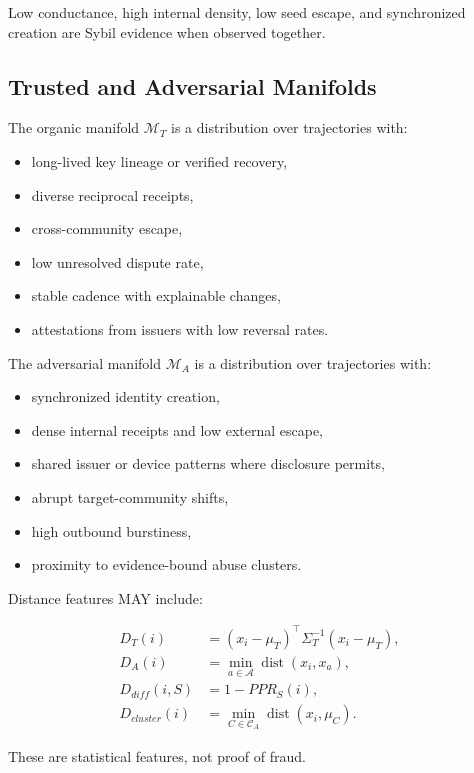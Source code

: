 \documentclass[11pt]{article}
\begin{document}
Low conductance, high internal density, low seed escape, and synchronized creation are Sybil evidence when observed together.

\subsection{Trusted and Adversarial Manifolds}

The organic manifold \(\mathcal{M}_T\) is a distribution over trajectories with:

\begin{itemize}
    \item long-lived key lineage or verified recovery,
    \item diverse reciprocal receipts,
    \item cross-community escape,
    \item low unresolved dispute rate,
    \item stable cadence with explainable changes,
    \item attestations from issuers with low reversal rates.
\end{itemize}

The adversarial manifold \(\mathcal{M}_A\) is a distribution over trajectories with:

\begin{itemize}
    \item synchronized identity creation,
    \item dense internal receipts and low external escape,
    \item shared issuer or device patterns where disclosure permits,
    \item abrupt target-community shifts,
    \item high outbound burstiness,
    \item proximity to evidence-bound abuse clusters.
\end{itemize}

Distance features MAY include:

\begin{align}
D_T(i)&=(x_i-\mu_T)^\top\Sigma_T^{-1}(x_i-\mu_T),\\
D_A(i)&=\min_{a\in\mathcal{A}}\operatorname{dist}(x_i,x_a),\\
D_{diff}(i,S)&=1-PPR_S(i),\\
D_{cluster}(i)&=\min_{C\in\mathcal{C}_A}\operatorname{dist}(x_i,\mu_C).
\end{align}

These are statistical features, not proof of fraud.
\end{document}
